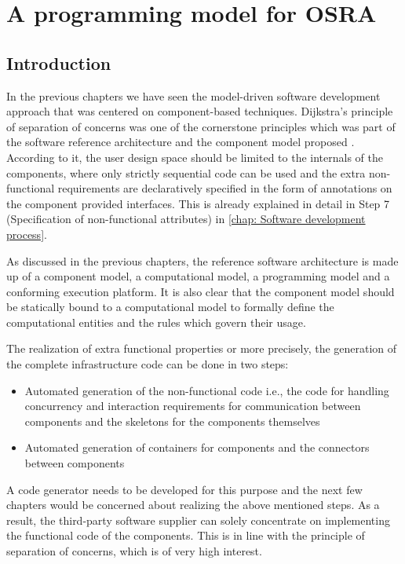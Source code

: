
\chapter{A programming model for OSRA}
\label{chap: Progamming model}

\section{Introduction}
In the previous chapters we have seen the model-driven software development approach that was centered on component-based techniques. Dijkstra's principle of separation of concerns was one of the cornerstone principles which was part of the software reference architecture and the component model proposed \cite{CompBasedProcess,EvoRAVCodeAr}. According to it, the user design space should be limited to the internals of the components, where only strictly sequential code can be used and the extra non-functional requirements are declaratively specified in the form of annotations on the component provided interfaces. This is already explained in detail in Step 7 (Specification of non-functional attributes) in \cref{chap: Software development process}. 

As discussed in the previous chapters, the reference software architecture is made up of a component model, a computational model, a programming model and a conforming execution platform. It is also clear that the component model should be statically bound to a computational model to formally define the computational entities and the rules which govern their usage.

The realization of extra functional properties or more precisely, the generation of the complete infrastructure code can be done in two steps:
\begin{itemize}
\item Automated generation of the non-functional code i.e., the code for handling concurrency and interaction requirements for communication between components and the skeletons for the components themselves
\item Automated generation of containers for components and the connectors between components 
\end{itemize}

A code generator needs to be developed for this purpose and the next few chapters would be concerned about realizing the above mentioned steps. As a result, the third-party software supplier can solely concentrate on implementing the functional code of the components. This is in line with the principle of separation of concerns, which is of very high interest.

